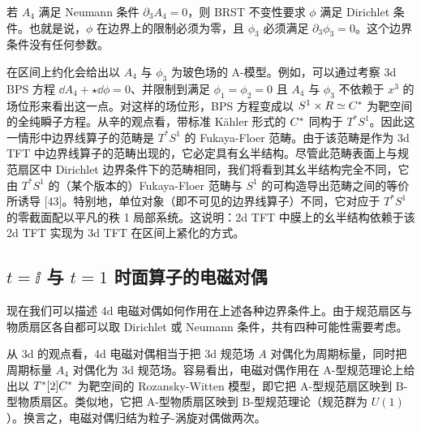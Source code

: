 若 $A_4$ 满足 Neumann 条件 $\partial_3A_4=0$，则 BRST 不变性要求 $\phi$ 满足 Dirichlet 条件。也就是说，$\phi$ 在边界上的限制必须为零，且 $\phi_3$ 必须满足 $\partial_3\phi_3=0$。这个边界条件没有任何参数。

在区间上约化会给出以 $A_4$ 与 $\phi_3$ 为玻色场的 A-模型。例如，可以通过考察 3d BPS 方程 $\dd A_4+\star\dd\phi=0$、并限制到满足 $\phi_1=\phi_2=0$ 且 $A_4$ 与 $\phi_3$ 不依赖于 $x^3$ 的场位形来看出这一点。对这样的场位形，BPS 方程变成以 $S^1\times R\simeq C^*$ 为靶空间的全纯瞬子方程。从辛的观点看，带标准 Kähler 形式的 $C^*$ 同构于 $T^*S^1$。因此这一情形中边界线算子的范畴是 $T^*S^1$ 的 Fukaya-Floer 范畴。由于该范畴是作为 3d TFT 中边界线算子的范畴出现的，它必定具有幺半结构。尽管此范畴表面上与规范扇区中 Dirichlet 边界条件下的范畴相同，我们将看到其幺半结构完全不同，它由 $T^*S^1$ 的（某个版本的）Fukaya-Floer 范畴与 $S^1$ 的可构造导出范畴之间的等价所诱导 [43]。特别地，单位对象（即不可见的边界线算子）不同，它对应于 $T^*S^1$ 的零截面配以平凡的秩 1 局部系统。这说明：2d TFT 中膜上的幺半结构依赖于该 2d TFT 实现为 3d TFT 在区间上紧化的方式。


\subsection{\texorpdfstring{$t=\ii$ 与 $t=1$}{t=i 与 t=1} 时面算子的电磁对偶}

现在我们可以描述 4d 电磁对偶如何作用在上述各种边界条件上。由于规范扇区与物质扇区各自都可以取 Dirichlet 或 Neumann 条件，共有四种可能性需要考虑。

从 3d 的观点看，4d 电磁对偶相当于把 3d 规范场 $A$ 对偶化为周期标量，同时把周期标量 $A_4$ 对偶化为 3d 规范场。容易看出，电磁对偶作用在 A-型规范理论上给出以 $T^*[2]C^*$ 为靶空间的 Rozansky-Witten 模型，即它把 A-型规范扇区映到 B-型物质扇区。类似地，它把 A-型物质扇区映到 B-型规范理论（规范群为 $U(1)$）。换言之，电磁对偶归结为粒子-涡旋对偶做两次。

